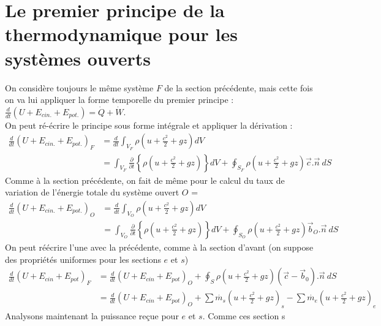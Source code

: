 \section{Le premier principe de la thermodynamique pour les systèmes 
ouverts}
\label{sec:premierprincipesysouverts}
On considère toujours le même système $F$ de la section précédente, mais 
cette fois on va lui appliquer la forme temporelle du premier principe :
$\frac{d}{dt}\left(U + E_{cin.} + E_{pot.}\right) = \dot{Q}+\dot{W}$. \\
On peut ré-écrire le principe sous forme intégrale et appliquer la 
dérivation :
\begin{equation}
\begin{split}
\frac{d}{dt}\left(U + E_{cin.} + E_{pot.}\right)_F &=
 \frac{d}{dt}\int_{V_F} \rho\left(u+\frac{c^2}{2}+gz\right)dV\\
& = \int_{V_F}\frac{\partial}{\partial t}\left\{\rho
\left(u+\frac{c^2}{2}+gz\right)\right\}dV + \oint_{S_F}\rho\left(u+\frac{
c^2}{2}+gz\right)\vec{c}.\vec{n}\ dS
\end{split}
\end{equation}
Comme à la section précédente, on fait de même pour le calcul du taux 
de variation de l'énergie totale du système ouvert $O$ = 
\begin{equation}
\begin{split}
\frac{d}{dt}\left(U + E_{cin.} + E_{pot.}\right)_O &=
 \frac{d}{dt}\int_{V_O} \rho\left(u+\frac{c^2}{2}+gz\right)dV\\
& = \int_{V_O}\frac{\partial}{\partial t}\left\{\rho
\left(u+\frac{c^2}{2}+gz\right)\right\}dV + \oint_{S_O}\rho\left(u+\frac{
c^2}{2}+gz\right)\vec{b}_O.\vec{n}\ dS
\end{split}
\end{equation}
On peut réécrire l'une avec la précédente, comme à la section d'avant (on 
suppose des propriétés uniformes pour les sections $e$ et $s$)
\begin{equation}
\begin{split}
\frac{d}{dt}\left(U+E_{cin}+E_{pot}\right)_F &= \frac{d}{dt}\left(U+E_{cin}+
E_{pot}\right)_O + \oint_S\rho\left(u+\frac{c^2}{2}+gz\right)(\vec{c}-\vec{b}_0)
.\vec{n}\ dS\\
&= \frac{d}{dt}\left(U+E_{cin}+E_{pot}\right)_O + \sum \dot{m_s}\left(
u+\frac{c^2}{2}+gz\right)_s -\sum \dot{m_e}\left(u+\frac{c^2}{2}+gz\right)_e
\end{split}
\end{equation}
Analysons maintenant la puissance reçue pour $e$ et $s$. Comme ces section s
